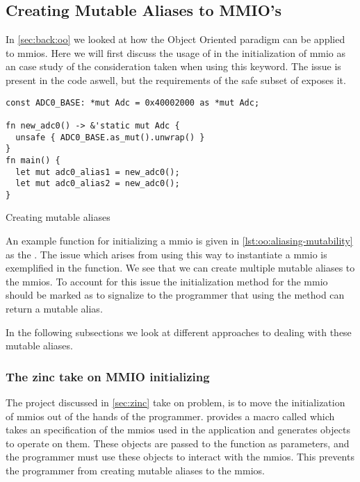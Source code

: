 \subsection{Creating Mutable Aliases to MMIO's}
\label{sec:res:aliasing-mmios}

In \autoref{sec:back:oo} we looked at how the Object Oriented paradigm can be applied to \glspl{mmio}.
Here we will first discuss the usage of {\unsafe} in the initialization of \gls{mmio} as an case study of the consideration taken when using this keyword.
The issue is present in the {\C} code aswell, but the requirements of the safe subset of {\rust} exposes it.

\begin{listing}[H]
  \begin{verbatim}
const ADC0_BASE: *mut Adc = 0x40002000 as *mut Adc;

fn new_adc0() -> &'static mut Adc {
  unsafe { ADC0_BASE.as_mut().unwrap() }
}
fn main() {
  let mut adc0_alias1 = new_adc0();
  let mut adc0_alias2 = new_adc0();
}
  \end{verbatim}
  \caption{Creating mutable aliases}
  \label{lst:oo:aliasing-mutability}
\end{listing}

An example function for initializing a \gls{mmio} is given in \autoref{lst:oo:aliasing-mutability} as the .
The issue which arises from using this way to instantiate a \gls{mmio} is exemplified in the {\main} function.
We see that we can create multiple mutable aliases to the \glspl{mmio}.
To account for this issue the initialization method for the \gls{mmio} should be marked as {\unsafe} to signalize to the programmer that using the method can return a mutable alias.

In the following subsections we look at different approaches to dealing with these mutable aliases.

\subsubsection{The zinc take on MMIO initializing}

The  project discussed in \autoref{sec:zinc} take on problem, is to move the initialization of \glspl{mmio} out of the hands of the programmer.
 provides a macro called  which takes an specification of the \glspl{mmio} used in the application and generates objects to operate on them.
These objects are passed to the {\main} function as parameters, and the programmer must use these objects to interact with the \glspl{mmio}.
This prevents the programmer from creating mutable aliases to the \glspl{mmio}.

